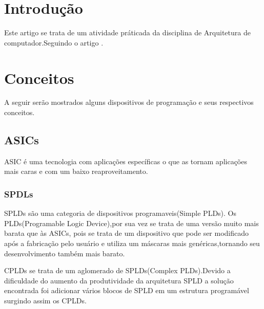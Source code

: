 \section{\esp Introdução}
Este artigo se trata de um atividade práticada da disciplina de Arquitetura de computador.Seguindo o artigo \cite{base}.

\section{\esp Conceitos}

A seguir serão mostrados alguns dispositivos de programação e seus respectivos conceitos.

\subsection{\esp ASICs}

ASIC é uma tecnologia com aplicações específicas o que as tornam aplicações mais caras e com um baixo reaproveitamento.

\subsubsection{\esp SPDLs}

SPLDs são uma categoria de dispositivos programaveis(Simple PLDs). Os PLDs(Programable Logic Device),por sua vez se trata de uma versão muito mais barata que às ASICs, pois se trata de um dispositivo que pode ser modificado após a fabricação pelo usuário e utiliza um máscaras mais genéricas,tornando seu desenvolvimento também mais barato.

 
CPLDs se trata de um aglomerado de SPLDs(Complex PLDs).Devido a dificuldade do aumento da produtividade da arquitetura SPLD a solução encontrada foi adicionar vários blocos de SPLD em um estrutura programável surgindo assim os CPLDs.
 
